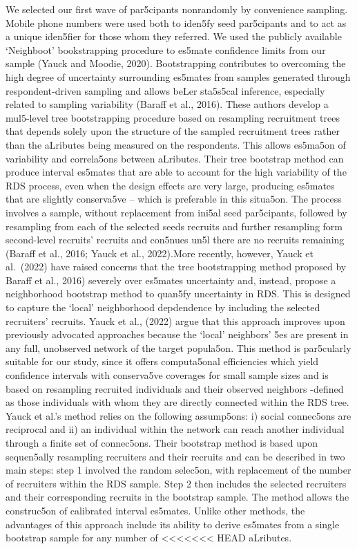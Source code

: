 \documentclass[
  12pt,
  letterpaper,
  DIV=11,
  numbers=noendperiod]{scrartcl}
\theoremstyle{plain}
\theoremstyle{definition}
\begin{document}
{We selected our first wave of par5cipants nonrandomly by convenience
sampling. Mobile phone numbers were used both to iden5fy seed
par5cipants and to act as a unique iden5fier for those whom they
referred. We used the publicly available `Neighboot' bookstrapping
procedure to es5mate confidence limits from our sample (Yauck and
Moodie, 2020). Bootstrapping contributes to overcoming the high degree
of uncertainty surrounding es5mates from samples generated through
respondent-driven sampling and allows beLer sta5s5cal inference,
especially related to sampling variability (Baraﬀ et al., 2016). These
authors develop a mul5-level tree bootstrapping procedure based on
resampling recruitment trees that depends solely upon the structure of
the sampled recruitment trees rather than the aLributes being measured
on the respondents. This allows es5ma5on of variability and correla5ons
between aLributes. Their tree bootstrap method can produce interval
es5mates that are able to account for the high variability of the RDS
process, even when the design eﬀects are very large, producing es5mates
that are slightly conserva5ve -- which is preferable in this situa5on.
The process involves a sample, without replacement from ini5al seed
par5cipants, followed by resampling from each of the selected seeds
recruits and further resampling form second-level recruits' recruits and
con5nues un5l there are no recruits remaining (Baraﬀ et al., 2016; Yauck
et al., 2022).More recently, however, Yauck et al.~(2022) have raised
concerns that the tree bootstrapping method proposed by Baraﬀ et al.,
2016) severely over es5mates uncertainty and, instead, propose a
neighborhood bootstrap method to quan5fy uncertainty in RDS. This is
designed to capture the `local' neighborhood depdendence by including
the selected recruiters' recruits. Yauck et al., (2022) argue that this
approach improves upon previously advocated approaches because the
`local' neighbors' 5es are present in any full, unobserved network of
the target popula5on. This method is par5cularly suitable for our study,
since it oﬀers computa5onal eﬃciencies which yield confidence intervals
with conserva5ve coverages for small sample sizes and is based on
resampling recruited individuals and their observed neighbors -defined
as those individuals with whom they are directly connected within the
RDS tree. Yauck et al.'s method relies on the following assump5ons: i)
social connec5ons are reciprocal and ii) an individual within the
network can reach another individual through a finite set of connec5ons.
Their bootstrap method is based upon sequen5ally resampling recruiters
and their recruits and can be described in two main steps: step 1
involved the random selec5on, with replacement of the number of
recruiters within the RDS sample. Step 2 then includes the selected
recruiters and their corresponding recruits in the bootstrap sample. The
method allows the construc5on of calibrated interval es5mates. Unlike
other methods, the advantages of this approach include its ability to
derive es5mates from a single bootstrap sample for any number of
<<<<<<< HEAD
aLributes.

}
\end{document}
